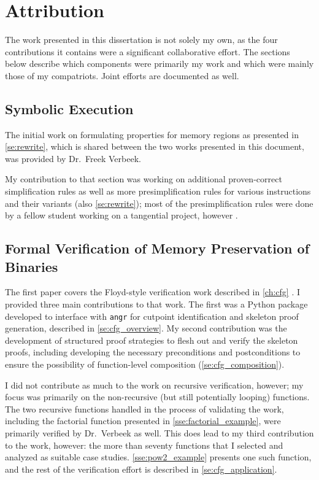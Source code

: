 \chapter{Attribution}\label{attribution}
The work presented in this dissertation is not solely my own,
as the four contributions it contains were a significant collaborative effort.
The sections below describe which components were primarily my work
and which were mainly those of my compatriots.
Joint efforts are documented as well.

\section*{Symbolic Execution}
The initial work on formulating properties for memory regions
as presented in \cref{se:rewrite},
which is shared between the two works presented in this document,
was provided by Dr.~Freek Verbeek.

My contribution to that section was working on additional proven-correct
simplification rules as well as more presimplification rules for
various instructions and their variants (also \cref{se:rewrite});
most of the presimplification rules
were done by a fellow student working on a tangential project,
however \autocite{verbeek2019refinement}.

\section*{Formal Verification of Memory Preservation of  Binaries}\label{attribute1}
The first paper covers the Floyd-style verification work described in \cref{ch:cfg} \autocite{bockenek2019preservation}.
I provided three main contributions to that work.
The first was a Python package developed to interface with \texttt{angr}
\autocite{shoshitaishvili2016state}
for cutpoint identification and skeleton proof generation,
described in \cref{se:cfg_overview}.
My second contribution was the development of structured proof strategies
to flesh out and verify the skeleton proofs,
including developing the necessary preconditions and postconditions to ensure
the possibility of function-level composition (\cref{se:cfg_composition}).

I did not contribute as much to the work on recursive verification, however;
my focus was primarily on the non-recursive (but still potentially looping) functions.
The two recursive functions handled in the process of validating the work,
including the factorial function presented in \cref{sse:factorial_example},
were primarily verified by Dr.~Verbeek as well.
This does lead to my third contribution to the work, however:
the more than seventy functions that I selected and analyzed as suitable case studies.
\cref{sse:pow2_example} presents one such function,
and the rest of the verification effort is described in \cref{se:cfg_application}.

